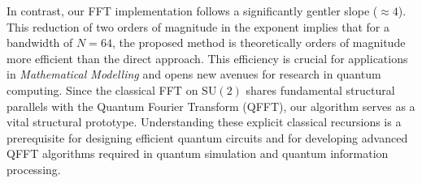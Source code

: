 \documentclass[11pt]{article}
\theoremstyle{definition}
\theoremstyle{remark}
\numberwithin{equation}{section}
\begin{document}
In contrast, our FFT implementation follows a significantly gentler slope ($\approx 4$). This reduction of two orders of magnitude in the exponent implies that for a bandwidth of $N=64$, the proposed method is theoretically orders of magnitude more efficient than the direct approach. This efficiency is crucial for applications in \textit{Mathematical Modelling} and opens new avenues for research in quantum computing. Since the classical FFT on $\mathrm{SU}(2)$ shares fundamental structural parallels with the Quantum Fourier Transform (QFFT), our algorithm serves as a vital structural prototype. Understanding these explicit classical recursions is a prerequisite for designing efficient quantum circuits and for developing advanced QFFT algorithms required in quantum simulation and quantum information processing.

























\end{document}
